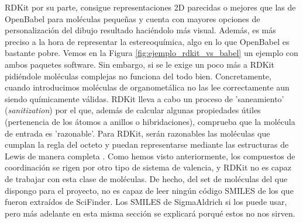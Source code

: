 RDKit por su parte, consigue representaciones 2D parecidas o mejores que las de OpenBabel para moléculas pequeñas y cuenta con mayores opciones de personalización del dibujo resultado \cite{rdkit_cookbook} haciéndolo más visual. Además, es más preciso a la hora de representar la estereoquímica, algo en lo que OpenBabel es bastante pobre. Vemos en la Figura \ref{fig:ejemplo_rdkit_vs_babel} un ejemplo con ambos paquetes software. Sin embargo, si se le exige un poco más a RDKit pidiéndole moléculas complejas no funciona del todo bien. Concretamente, cuando introducimos moléculas de organometálica no las lee correctamente aun siendo químicamente válidas. RDKit lleva a cabo un proceso de 'saneamiento' (\textit{sanitization}) \cite{rdkit_docbook} por el que, además de calcular algunas propiedades útiles (pertenencia de los átomos a anillos o hibridaciones), comprueba que la molécula de entrada es 'razonable'. Para RDKit, serán razonables las moléculas que cumplan la regla del octeto \cite{lewis2} y puedan representarse mediante las estructuras de Lewis de manera completa \cite{lewis_2013, lewis2}. Como hemos visto anteriormente, los compuestos de coordinación se rigen por otro tipo de sistema de valencia, y RDKit no es capaz de trabajar con esta clase de moléculas. De hecho, del set de moléculas del que dispongo para el proyecto, no es capaz de leer ningún código SMILES de los que fueron extraídos de SciFinder. Los SMILES de SigmaAldrich si los puede usar, pero más adelante en esta misma sección se explicará porqué estos no nos sirven.

